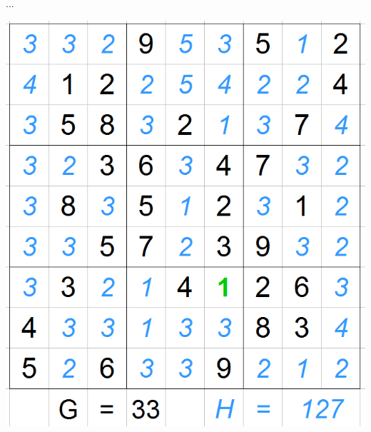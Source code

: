 \begin{frame}

\begin{minipage}{.2\textwidth}
\huge{...}
\end{minipage}\hfill
\begin{minipage}{.8\textwidth}
\includegraphics[scale=0.4]{images/ASTARExample/1.png}
\end{minipage}

\end{frame}

